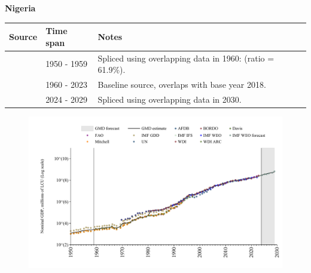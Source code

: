 \documentclass[12pt,a4paper,landscape]{article}
\begin{document}
\begin{adjustbox}{max totalsize={\paperwidth}{\paperheight},center}
\begin{minipage}[t][\textheight][t]{\textwidth}
\vspace*{0.5cm}
{}
\begin{center}
{\Large\bfseries Nigeria}
\end{center}
\vspace{0.5cm}
\begin{table}[H]
\centering
\small
\begin{tabular}{|l|l|l|}
\hline
\textbf{Source} & \textbf{Time span} & \textbf{Notes} \\
\hline
\rowcolor{white}\cite{IMF_GDD}& 1950 - 1959 &Spliced using overlapping data in 1960: (ratio = 61.9\%).\\
\rowcolor{lightgray}\cite{WDI}& 1960 - 2023 &Baseline source, overlaps with base year 2018.\\
\rowcolor{white}\cite{IMF_WEO_forecast}& 2024 - 2029 &Spliced using overlapping data in 2030.\\
\hline
\end{tabular}
\end{table}
\begin{figure}[H]
\centering
\includegraphics[width=\textwidth,height=0.6\textheight,keepaspectratio]{graphs/NGA_nGDP.pdf}
\end{figure}
\end{minipage}
\end{adjustbox}
\end{document}

